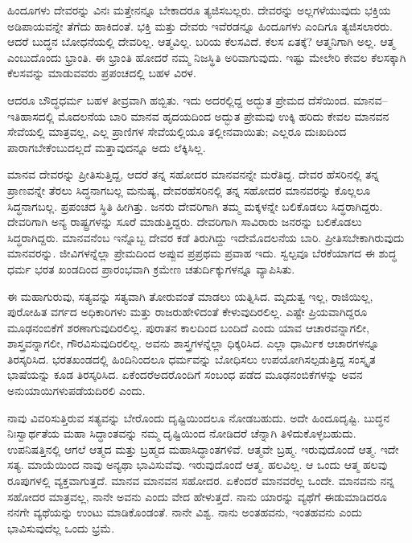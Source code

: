 ಹಿಂದೂಗಳು ದೇವರನ್ನು ವಿನಃ ಮತ್ತೇನನ್ನೂ ಬೇಕಾದರೂ ತ್ಯಜಿಸಬಲ್ಲರು. ದೇವರನ್ನು ಅಲ್ಲಗಳೆಯುವುದು ಭಕ್ತಿಯ ಅಡಿಪಾಯವನ್ನೇ ತೆಗೆದು ಹಾಕಿದಂತೆ. ಭಕ್ತಿ ಮತ್ತು ದೇವರು ಇವೆರಡನ್ನೂ ಹಿಂದೂಗಳು ಎಂದಿಗೂ ತ್ಯಜಿಸಲಾರರು. ಆದರೆ ಬುದ್ಧನ ಬೋಧನೆ\-ಯಲ್ಲಿ ದೇವರಿಲ್ಲ. ಆತ್ಮವಿಲ್ಲ. ಬರಿಯ ಕೆಲಸವಿದೆ. ಕೆಲಸ ಏತಕ್ಕೆ? ಆತ್ಮನಿಗಾಗಿ ಅಲ್ಲ. ಆತ್ಮ ಎಂಬುದೊಂದು ಭ್ರಾಂತಿ. ಈ ಭ್ರಾಂತಿ ಹೋದರೆ ನಮ್ಮ ನಿಜಸ್ಥಿತಿ ಅರಿವಾಗುವುದು. ಇಷ್ಟು ಮೇಲೇರಿ ಕೇವಲ ಕೆಲಸಕ್ಕಾಗಿ ಕೆಲಸವನ್ನು ಮಾಡುವವರು ಪ್ರಪಂಚದಲ್ಲಿ ಬಹಳ ವಿರಳ.

ಆದರೂ ಬೌದ್ಧಧರ್ಮ ಬಹಳ ತೀವ್ರವಾಗಿ ಹಬ್ಬಿತು. ಇದು ಅದರಲ್ಲಿದ್ದ ಅದ್ಭುತ ಪ್ರೇಮದ ದೆಸೆಯಿಂದ. ಮಾನವ–ಇತಿಹಾಸದಲ್ಲಿ ಮೊದಲನೆಯ ಬಾರಿ ಮಾನವ ಹೃದಯದಿಂದ ಅದ್ಭುತ ಪ್ರೇಮವು ಉಕ್ಕಿ ಹರಿದು ಕೇವಲ ಮಾನವನ ಸೇವೆಯಲ್ಲಿ ಮಾತ್ರವಲ್ಲ, ಎಲ್ಲ ಪ್ರಾಣಿಗಳ ಸೇವೆಯಲ್ಲಿಯೂ ತಲ್ಲೀನವಾಯಿತು; ಎಲ್ಲರೂ ದುಃಖದಿಂದ ಪಾರಾಗಬೇಕೆಂಬುದಲ್ಲದೆ ಮತ್ತಾವುದನ್ನೂ ಅದು ಲೆಕ್ಕಿಸಿಲ್ಲ.

\vskip 0.1cm

ಮಾನವ ದೇವರನ್ನು ಪ್ರೀತಿಸುತ್ತಿದ್ದ, ಆದರೆ ತನ್ನ ಸಹೋದರ ಮಾನವನನ್ನೇ ಮರೆತಿದ್ದ. ದೇವರ ಹೆಸರಿನಲ್ಲಿ ತನ್ನ ಪ್ರಾಣವನ್ನೇ ತೆರಲು ಸಿದ್ಧನಾಗಬಲ್ಲ ಮನುಷ್ಯ, ದೇವರ\break ಹೆಸರಿನಲ್ಲಿ ತನ್ನ ಸಹೋದರ ಮಾನವರನ್ನು ಕೊಲ್ಲಲೂ ಸಿದ್ಧನಾಗಬಲ್ಲ. ಪ್ರಪಂಚದ ಸ್ಥಿತಿ ಹೀಗಿತ್ತು. ಜನರು ದೇವರಿಗಾಗಿ ತಮ್ಮ ಮಕ್ಕಳನ್ನೇ ಬಲಿಕೊಡಲು ಸಿದ್ಧರಾಗಿದ್ದರು. ದೇವರಿಗಾಗಿ ಅನ್ಯ ರಾಷ್ಟ್ರಗಳನ್ನು ಸೂರೆ ಮಾಡುತ್ತಿದ್ದರು. ದೇವರಿಗಾಗಿ ಸಾವಿರಾರು ಜನರನ್ನು ಬಲಿಕೊಡಲು ಸಿದ್ಧರಾಗಿದ್ದರು. ಮಾನವನೆಂಬ ಇನ್ನೊಬ್ಬ ದೇವರ ಕಡೆ ತಿರುಗಿದ್ದು ಇದೇ\break ಮೊದಲನೆಯ ಬಾರಿ. ಪ್ರೀತಿಸಬೇಕಾಗಿರುವುದು ಮಾನವರನ್ನು. ಜೀವಿಗಳನ್ನೆಲ್ಲಾ ಪ್ರೇಮದಿಂದ ಅಪ್ಪುವ ಪ್ರಪ್ರಥಮ ಪ್ರವಾಹ ಇದು. ಸ್ವಲ್ಪವೂ ಬೆರಕೆಯಾಗದ ಈ ಶುದ್ಧ ಧರ್ಮ ಭರತ ಖಂಡದಿಂದ ಪ್ರಾರಂಭವಾಗಿ ಕ್ರಮೇಣ ಚತುರ್ದಿಕ್ಕುಗಳನ್ನೂ ವ್ಯಾಪಿಸಿತು.

\vskip 0.1cm

ಈ ಮಹಾಗುರುವು, ಸತ್ಯವನ್ನು ಸತ್ಯವಾಗಿ ತೋರುವಂತೆ ಮಾಡಲು ಯತ್ನಿಸಿದ. ಮೃದುತ್ವ ಇಲ್ಲ, ರಾಜಿಯಿಲ್ಲ, ಪುರೋಹಿತ ವರ್ಗದ ಅಧಿಕಾರಿಗಳು ಮತ್ತು ರಾಜರು\break ಹೇಳಿದಂತೆ ಕೇಳುವುದಿರಲಿಲ್ಲ. ಎಷ್ಟೇ ಪ್ರಿಯವಾಗಿದ್ದರೂ ಮೂಢನಂಬಿಕೆಗೆ ಶರಣಾಗುವು\-ದಿರಲಿಲ್ಲ. ಪುರಾತನ ಕಾಲದಿಂದ ಬಂದಿದೆ ಎಂದು ಯಾವ ಆಚಾರವನ್ನಾಗಲೀ, ಶಾಸ್ತ್ರವನ್ನಾಗಲೀ, ಗೌರವಿಸುವುದಿರಲಿಲ್ಲ. ಅವನು ಶಾಸ್ತ್ರಗಳನ್ನೆಲ್ಲಾ ಧಿಕ್ಕರಿಸಿದ. ಎಲ್ಲಾ ಧಾರ್ಮಿಕ ಆಚಾರಗಳನ್ನೂ ತಿರಸ್ಕರಿಸಿದ. ಭರತಖಂಡದಲ್ಲಿ ಹಿಂದಿನಿಂದಲೂ ಧರ್ಮವನ್ನು ಬೋಧಿಸಲು ಉಪಯೋಗಿಸಲ್ಪಡುತ್ತಿದ್ದ ಸಂಸ್ಕೃತ ಭಾಷೆಯನ್ನು ಕೂಡ ತಿರಸ್ಕರಿಸಿದ. ಏಕೆಂದರೆ\break ಅದರೊಂದಿಗೆ ಸಂಬಂಧ ಪಡೆದ ಮೂಢನಂಬಿಕೆಗಳನ್ನು ಅವನ ಅನುಯಾಯಿಗಳು\break ಪಡೆಯದಿರಲಿ ಎಂದು.

\vskip 0.1cm

ನಾವು ವಿವರಿಸುತ್ತಿರುವ ಸತ್ಯವನ್ನು ಬೇರೊಂದು ದೃಷ್ಟಿಯಿಂದಲೂ ನೋಡಬಹುದು. ಅದೇ ಹಿಂದೂದೃಷ್ಟಿ. ಬುದ್ಧನ ನಿಃಸ್ವಾರ್ಥತೆಯ ಮಹಾ ಸಿದ್ಧಾಂತವನ್ನು ನಮ್ಮ ದೃಷ್ಟಿಯಿಂದ ನೋಡಿದರೆ ಚೆನ್ನಾಗಿ ತಿಳಿದುಕೊಳ್ಳಬಹುದು. ಉಪನಿಷತ್ತಿನಲ್ಲಿ ಆಗಲೆ ಆತ್ಮದ ಮತ್ತು ಬ್ರಹ್ಮದ ಮಹಾಸಿದ್ಧಾಂತಗಳಿವೆ. ಆತ್ಮವೇ ಬ್ರಹ್ಮ. ಇರುವುದೊಂದೆ ಆತ್ಮ. ಇದೇ ಸತ್ಯ. ಮಾಯೆಯಿಂದ ನಾವು ಅನ್ಯಥಾ ಭಾವಿಸುವೆವು. ಇರುವುದೊಂದೆ ಆತ್ಮ. ಹಲವಿಲ್ಲ. ಆ ಒಂದು ಆತ್ಮ ಹಲವು ರೂಪುಗಳಲ್ಲಿ ವ್ಯಕ್ತವಾಗುತ್ತದೆ. ಮಾನವ ಮಾನವನ ಸಹೋದರ. ಏಕೆಂದರೆ ಮಾನವರೆಲ್ಲ ಒಂದೇ. ಮಾನವನು ನನ್ನ ಸಹೋದರ ಮಾತ್ರವಲ್ಲ, ನಾನೇ ಅವನು ಎಂದು ವೇದ ಹೇಳುತ್ತದೆ. ನಾನು ಯಾರನ್ನು ವ್ಯಥೆಗೆ ಈಡುಮಾಡಿದರೂ ನನಗೇ ವ್ಯಥೆಯನ್ನು ಉಂಟು ಮಾಡಿಕೊಂಡಂತೆ. ನಾನೇ ವಿಶ್ವ. ನಾನು ಅಂತಹವನು, ಇಂತಹವನು ಎಂದು ಭಾವಿಸುವುದೆಲ್ಲ ಒಂದು ಭ್ರಮೆ.

